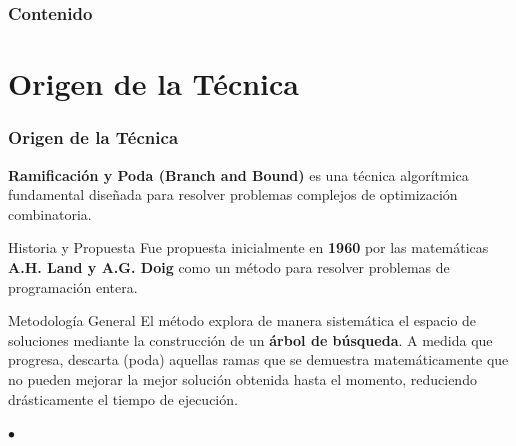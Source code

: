 \documentclass[aspectratio=169]{beamer}
\author[V. Navarro, C. Venegas]{
	\href{mailto:\correoa}{\autora}\\
	\href{mailto:\correob}{\autorb}}
\begin{document}
\begin{frame}[plain]
    \titlepage
\end{frame}

\section[Contenido]{}
\begin{frame}
    \frametitle{\textbf{Contenido}}
    \setcounter{tocdepth}{1}
    \scriptsize
    \tableofcontents[]
\end{frame}


\section{Origen de la Técnica}

\begin{frame}[fragile]
    \frametitle{Origen de la Técnica}
    \justifying
    \textbf{Ramificación y Poda (Branch and Bound)} es una técnica algorítmica fundamental diseñada para resolver problemas complejos de optimización combinatoria.
    
    \begin{block}{Historia y Propuesta}
        Fue propuesta inicialmente en \textbf{1960} por las matemáticas \textbf{A.H. Land y A.G. Doig} como un método para resolver problemas de programación entera.
    \end{block}
    
    \begin{block}{Metodología General}
        El método explora de manera sistemática el espacio de soluciones mediante la construcción de un \textbf{árbol de búsqueda}. A medida que progresa, descarta (poda) aquellas ramas que se demuestra matemáticamente que no pueden mejorar la mejor solución obtenida hasta el momento, reduciendo drásticamente el tiempo de ejecución.
    \end{block}
    
    \vspace{0.2cm}
    \begin{center}
         \quad $\bullet$ \quad {}
    \end{center}
\end{frame}
\end{document}
